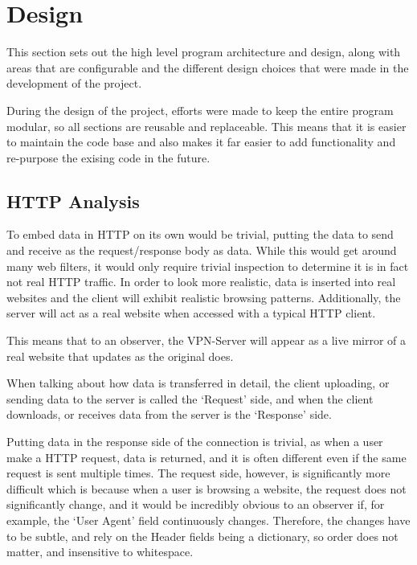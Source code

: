 \section{Design}
This section sets out the high level program architecture and design, along with areas that are configurable and the different design choices that were made in the development of the project.

During the design of the project, efforts were made to keep the entire program modular, so all sections are reusable and replaceable. This means that it is easier to maintain the code base and also makes it far easier to add functionality and re-purpose the exising code in the future.
\subsection{HTTP Analysis}
To embed data in HTTP on its own would be trivial, putting the data to send and receive as the request/response body as data. While this would get around many web filters, it would only require trivial inspection to determine it is in fact not real HTTP traffic.
In order to look more realistic, data is inserted into real websites and the client will exhibit realistic browsing patterns. Additionally, the server will act as a real website when accessed with a typical HTTP client.

This means that to an observer, the VPN-Server will appear as a live mirror of a real website that updates as the original does.

When talking about how data is transferred in detail, the client uploading, or sending data to the server is called the `Request' side, and when the client downloads, or receives data from the server is the `Response' side.

Putting data in the response side of the connection is trivial, as when a user make a HTTP request, data is returned, and it is often different even if the same request is sent multiple times.
The request side, however, is significantly more difficult which is because when a user is browsing a website, the request does not significantly change, and it would be incredibly obvious to an observer if, for example, the `User Agent' field continuously changes. Therefore, the changes have to be subtle, and rely on the Header fields being a dictionary, so order does not matter, and insensitive to whitespace.

\newpage
